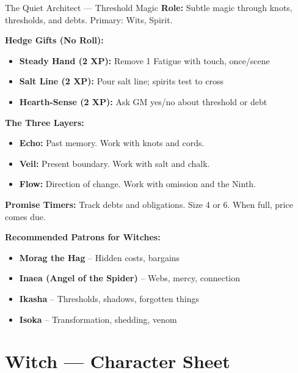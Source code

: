 \documentclass[10pt]{article}
\begin{document}
\begin{tipbox}{The Quiet Architect --- Threshold Magic}
    \textbf{Role:} Subtle magic through knots, thresholds, and debts. Primary: Wits, Spirit.
    
    \textbf{Hedge Gifts (No Roll):}
    \begin{itemize}
        \item \textbf{Steady Hand (2 XP):} Remove 1 Fatigue with touch, once/scene
        \item \textbf{Salt Line (2 XP):} Pour salt line; spirits test to cross
        \item \textbf{Hearth-Sense (2 XP):} Ask GM yes/no about threshold or debt
    \end{itemize}
    
    \textbf{The Three Layers:}
    \begin{itemize}
        \item \textbf{Echo:} Past memory. Work with knots and cords.
        \item \textbf{Veil:} Present boundary. Work with salt and chalk.
        \item \textbf{Flow:} Direction of change. Work with omission and the Ninth.
    \end{itemize}
    
    \textbf{Promise Timers:} Track debts and obligations. Size 4 or 6. When full, price comes due.
    
    \textbf{Recommended Patrons for Witches:}
    \begin{itemize}
        \item \textbf{Morag the Hag} -- Hidden costs, bargains
        \item \textbf{Inaea (Angel of the Spider)} -- Webs, mercy, connection
        \item \textbf{Ikasha} -- Thresholds, shadows, forgotten things
        \item \textbf{Isoka} -- Transformation, shedding, venom
    \end{itemize}
\end{tipbox}

\newpage

\section*{Witch --- Character Sheet}
\end{document}
